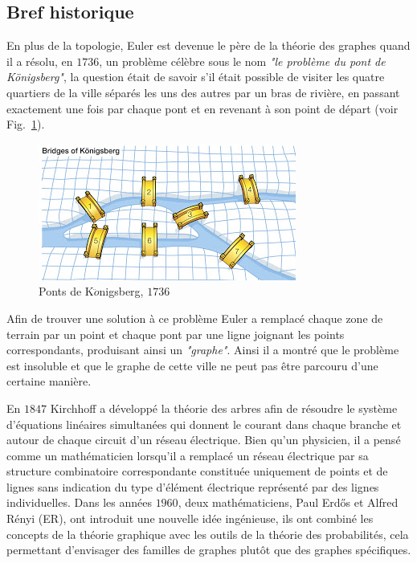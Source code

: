   \subsection{Bref historique}
  En plus de la topologie, Euler est devenue le père de la théorie des graphes quand il a résolu, en $1736$, un problème célèbre
sous le nom \textit{"le problème du pont de K\"{o}nigsberg"}, la question était de savoir s'il était possible de visiter les quatre
quartiers de la ville séparés les uns des autres par un bras de rivière, en passant exactement une fois par chaque pont et en 
revenant à son point de départ (voir Fig.~\ref{Konig}).
\begin{figure}[h!]
\centering
\includegraphics[scale=0.7]{./figures/Konig}
\caption{Ponts de K$\ddot{o}$nigsberg, $1736$}
\label{Konig}
\end{figure}
Afin de trouver une solution à ce problème Euler a remplacé chaque zone de terrain par un point et chaque pont par une ligne 
joignant les points correspondants, produisant ainsi un \textit{"graphe"}. Ainsi il a montré que le problème
est insoluble et que le graphe de cette ville ne peut pas être parcouru d'une certaine manière.

En $1847$ Kirchhoff a développé la théorie des arbres afin de résoudre le système d'équations linéaires simultanées qui 
donnent le courant dans chaque branche et autour de chaque circuit d'un réseau électrique. Bien qu'un physicien, il a pensé comme un mathématicien lorsqu'il a remplacé un réseau électrique par sa structure combinatoire  correspondante constituée uniquement de points et de lignes sans indication du type d'élément électrique représenté par des lignes individuelles.
Dans les années $1960$, deux mathématiciens, Paul Erd\H{o}s et Alfred Rényi (ER), ont introduit une nouvelle idée ingénieuse, ils ont 
combiné les concepts de la théorie graphique avec les outils de la théorie des probabilités, cela permettant d'envisager des
familles de graphes plutôt que des graphes spécifiques.


